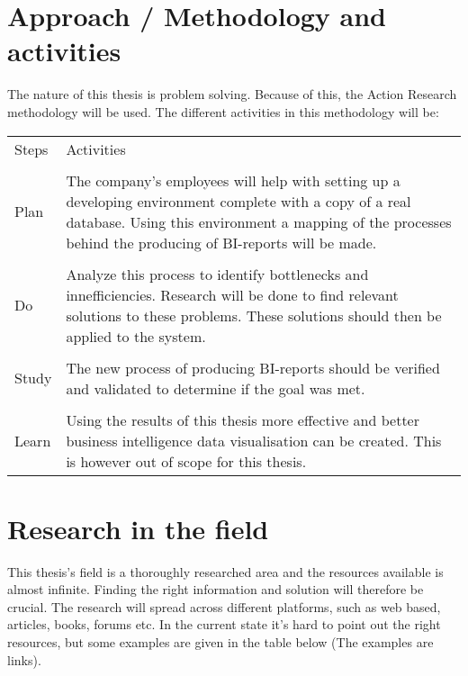 \documentclass[12pt,a4paper]{article}
\begin{document}
\section*{Approach / Methodology and activities}
The nature of this thesis is problem solving. Because of this, the Action Research methodology will be used. The different activities in this methodology will be:

\begin{table}[H]
\begin{tabular}{l p{14cm}}
 Steps & Activities \\ 
\\Plan & The company's employees will help with setting up a developing environment complete with a copy of a real database. Using this environment a mapping of the processes behind the producing of BI-reports will be made. \\ 
\\Do & Analyze this process to identify bottlenecks and innefficiencies. Research will be done to find relevant solutions to these problems. These solutions should then be applied to the system.\\
\\ Study & The new process of producing BI-reports should be verified and validated to determine if the goal was met.\\
\\ Learn & Using the results of this thesis more effective and better business intelligence data visualisation can be created. This is however out of scope for this thesis.
\end{tabular}
\end{table}


\section*{Research in the field}
This thesis's field is a thoroughly researched area and the resources available is almost infinite. Finding the right information and solution will therefore be crucial. The research will spread across different platforms, such as web based, articles, books, forums etc.  In the current state it's hard to point out the right resources, but some examples are given in the table below (The examples are links).
\end{document}
